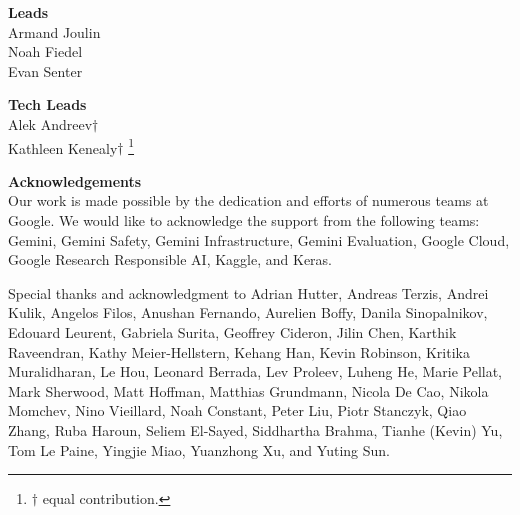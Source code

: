 \noindent\textbf{Leads} \\
Armand Joulin \\
Noah Fiedel \\
Evan Senter

\noindent\textbf{Tech Leads} \\
Alek Andreev\begin{math}\dagger{}\end{math} \\
Kathleen Kenealy\begin{math}\dagger{}\end{math}
{\let\thefootnote\relax\footnote{\begin{math}\dagger{}\end{math} equal contribution.}}

\noindent\textbf{Acknowledgements} \\
Our work is made possible by the dedication and efforts of numerous teams at Google. We
would like to acknowledge the support from the following teams: Gemini, Gemini Safety, Gemini Infrastructure, Gemini Evaluation, Google Cloud, Google Research Responsible AI, Kaggle, and Keras.

\vspace{-3mm}
Special thanks and acknowledgment to Adrian Hutter, Andreas Terzis, Andrei Kulik, Angelos Filos, Anushan Fernando, Aurelien Boffy, Danila Sinopalnikov, Edouard Leurent, Gabriela Surita, Geoffrey Cideron, Jilin Chen, Karthik Raveendran, Kathy Meier-Hellstern, Kehang Han, Kevin Robinson, Kritika Muralidharan, Le Hou, Leonard Berrada, Lev Proleev, Luheng He, Marie Pellat, Mark Sherwood, Matt Hoffman, Matthias Grundmann, Nicola De Cao, Nikola Momchev, Nino Vieillard, Noah Constant, Peter Liu, Piotr Stanczyk, Qiao Zhang, Ruba Haroun, Seliem El-Sayed, Siddhartha Brahma, Tianhe (Kevin) Yu, Tom Le Paine, Yingjie Miao, Yuanzhong Xu, and Yuting Sun.

